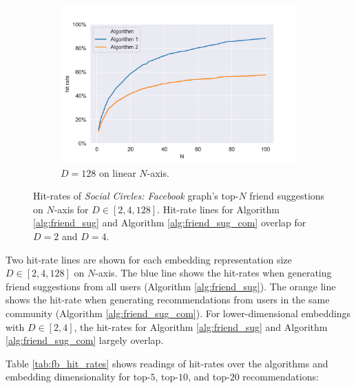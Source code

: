\documentclass[conference]{IEEEtran}
\begin{document}
\begin{figure}[htbp]
    \begin{subfigure}{.48\textwidth}
        \centering
        \includegraphics[width=1\linewidth]{images/fb/hit_rates_d-128.png}
        \caption{$D=128$ on linear $N$-axis.}
        \label{fig:fb_hit_rates_d128}
    \end{subfigure}%

    \caption{Hit-rates of \textit{Social Circles: Facebook} graph's top-$N$ friend suggestions on $N$-axis for $D \in [2,4,128]$. Hit-rate lines for Algorithm \ref{alg:friend_sug} and Algorithm \ref{alg:friend_sug_com} overlap for $D=2$ and $D=4$.}
    \label{fig:fb_hit_rates}
\end{figure}

Two hit-rate lines are shown for each embedding representation size $D \in [2,4,128]$ on $N$-axis. The blue line shows the hit-rates when generating friend suggestions from all users (Algorithm \ref{alg:friend_sug}). The orange line shows the hit-rate when generating recommendations from users in the same community (Algorithm \ref{alg:friend_sug_com}). For lower-dimensional embeddings with $D \in [2,4]$, the hit-rates for Algorithm \ref{alg:friend_sug} and Algorithm \ref{alg:friend_sug_com} largely overlap.

Table \ref{tab:fb_hit_rates} shows readings of hit-rates over the algorithms and embedding dimensionality for top-$5$, top-$10$, and top-$20$ recommendations:
\end{document}

